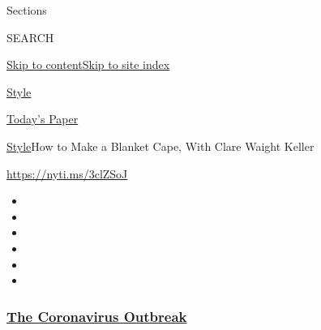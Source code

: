 Sections

SEARCH

\protect\hyperlink{site-content}{Skip to
content}\protect\hyperlink{site-index}{Skip to site index}

\href{https://www.nytimes3xbfgragh.onion/section/style}{Style}

\href{https://myaccount.nytimes3xbfgragh.onion/auth/login?response_type=cookie\&client_id=vi}{}

\href{https://www.nytimes3xbfgragh.onion/section/todayspaper}{Today's
Paper}

\href{/section/style}{Style}\textbar{}How to Make a Blanket Cape, With
Clare Waight Keller

\url{https://nyti.ms/3clZSoJ}

\begin{itemize}
\item
\item
\item
\item
\item
\item
\end{itemize}

\hypertarget{the-coronavirus-outbreak}{%
\subsubsection{\texorpdfstring{\href{https://www.nytimes3xbfgragh.onion/news-event/coronavirus?name=styln-coronavirus-national\&region=TOP_BANNER\&block=storyline_menu_recirc\&action=click\&pgtype=Article\&impression_id=c75236c0-f279-11ea-b3ae-754b2373ddeb\&variant=undefined}{The
Coronavirus
Outbreak}}{The Coronavirus Outbreak}}\label{the-coronavirus-outbreak}}

